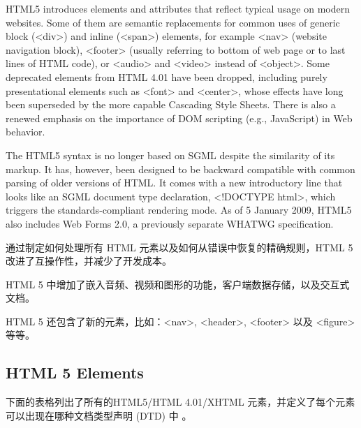 HTML5 introduces elements and attributes that reflect typical usage on modern websites. Some of them are semantic replacements for common uses of generic block (<div>) and inline (<span>) elements, for example <nav> (website navigation block), <footer> (usually referring to bottom of web page or to last lines of HTML code), or <audio> and <video> instead of <object>. Some deprecated elements from HTML 4.01 have been dropped, including purely presentational elements such as <font> and <center>, whose effects have long been superseded by the more capable Cascading Style Sheets. There is also a renewed emphasis on the importance of DOM scripting (e.g., JavaScript) in Web behavior.

The HTML5 syntax is no longer based on SGML despite the similarity of its markup. It has, however, been designed to be backward compatible with common parsing of older versions of HTML. It comes with a new introductory line that looks like an SGML document type declaration, <!DOCTYPE html>, which triggers the standards-compliant rendering mode. As of 5 January 2009, HTML5 also includes Web Forms 2.0, a previously separate WHATWG specification.

通过制定如何处理所有 HTML 元素以及如何从错误中恢复的精确规则，HTML 5 改进了互操作性，并减少了开发成本。

HTML 5 中增加了嵌入音频、视频和图形的功能，客户端数据存储，以及交互式文档。

HTML 5 还包含了新的元素，比如：<nav>, <header>, <footer> 以及 <figure> 等等。


\subsection{HTML 5 Elements}




下面的表格列出了所有的HTML5/HTML 4.01/XHTML 元素，并定义了每个元素可以出现在哪种文档类型声明 (DTD) 中 。


